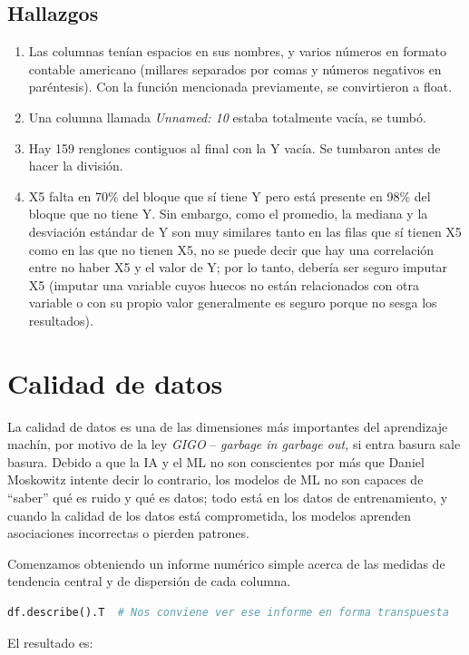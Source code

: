 \documentclass[spanish,oneside]{book} %
\begin{document}
\subsection{Hallazgos}

\begin{enumerate}
   \item Las columnas tenían espacios en sus nombres, y varios números en formato contable americano (millares separados por comas y números negativos en paréntesis). Con la función mencionada previamente, se convirtieron a float.
   \item Una columna llamada \textit{Unnamed: 10} estaba totalmente vacía, se tumbó.
   \item Hay 159 renglones contiguos al final con la Y vacía. Se tumbaron antes de hacer la división.
   \item X5 falta en 70\% del bloque que sí tiene Y pero está presente en 98\% del bloque que no tiene Y. Sin embargo, como el promedio, la mediana y la desviación estándar de Y son muy similares tanto en las filas que sí tienen X5 como en las que no tienen X5, no se puede decir que hay una correlación entre no haber X5 y el valor de Y; por lo tanto, debería ser seguro imputar X5 (imputar una variable cuyos huecos no están relacionados con otra variable o con su propio valor generalmente es seguro porque no sesga los resultados).
\end{enumerate}



\section{Calidad de datos}

La calidad de datos es una de las dimensiones más importantes del aprendizaje machín, por motivo de la ley \textit{GIGO} -- \textit{garbage in garbage out,} si entra basura sale basura. Debido a que la IA y el ML no son conscientes por más que Daniel Moskowitz intente decir lo contrario, los modelos de ML no son capaces de ``saber'' qué es ruido y qué es datos; todo está en los datos de entrenamiento, y cuando la calidad de los datos está comprometida, los modelos aprenden asociaciones incorrectas o pierden patrones. 

Comenzamos obteniendo un informe numérico simple acerca de las medidas de tendencia central y de dispersión de cada columna.

\begin{lstlisting}[language=Python]
df.describe().T  # Nos conviene ver ese informe en forma transpuesta
\end{lstlisting}

El resultado es:








% 
% 
% 
\end{document}
